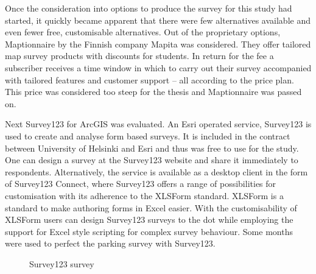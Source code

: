 Once the consideration into options to produce the survey for this study had started, it quickly became apparent that there were few alternatives available and even fewer free, customisable alternatives. Out of the proprietary options, Maptionnaire by the Finnish company Mapita was considered. They offer tailored map survey products with discounts for students. In return for the fee a subscriber receives a time window in which to carry out their survey accompanied with tailored features and customer support -- all according to the price plan. This price was considered too steep for the thesis and Maptionnaire was passed on. 

Next Survey123 for ArcGIS was evaluated. An Esri operated service, Survey123 is used to create and analyse form based surveys. It is included in the contract between University of Helsinki and Esri and thus was free to use for the study. One can design a survey at the Survey123 website and share it immediately to respondents. Alternatively, the service is available as a desktop client in the form of Survey123 Connect, where Survey123 offers a range of possibilities for customisation with its adherence to the XLSForm standard. XLSForm is a standard to make authoring forms in Excel easier. With the customisability of XLSForm users can design Survey123 surveys to the dot while employing the support for Excel style scripting for complex survey behaviour. Some months were used to perfect the parking survey with Survey123. 

\begin{figure}[H]%
    \centering
    \caption{Survey123 survey}%
    \label{fig:survey123}%
\end{figure}


